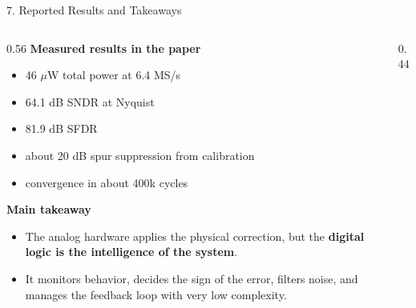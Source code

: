 \documentclass[aspectratio=169]{beamer}
\begin{document}
\begin{frame}{7. Reported Results and Takeaways}
  \begin{columns}[T]
    \begin{column}{0.56\textwidth}
      \small
      \textbf{Measured results in the paper}
      \begin{itemize}
        \item 46 \(\mu\)W total power at 6.4 MS/s
        \item 64.1 dB SNDR at Nyquist
        \item 81.9 dB SFDR
        \item about 20 dB spur suppression from calibration
        \item convergence in about 400k cycles
      \end{itemize}

      \textbf{Main takeaway}
      \begin{itemize}
        \item The analog hardware applies the physical correction, but the \textbf{digital logic is the intelligence of the system}.
        \item It monitors behavior, decides the sign of the error, filters noise, and manages the feedback loop with very low complexity.
      \end{itemize}
    \end{column}
    \begin{column}{0.44\textwidth}
      \centering
    \end{column}
  \end{columns}
\end{frame}
\end{document}
